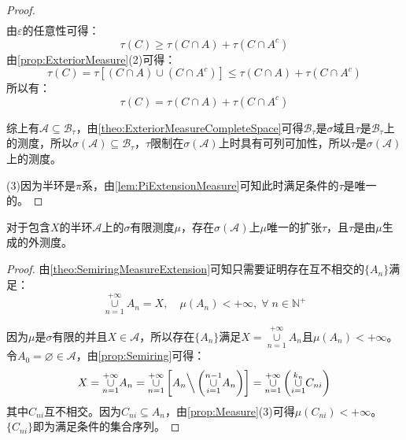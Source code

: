 \begin{proof}
\begin{align*}
	\end{align*}
	由$\varepsilon$的任意性可得：
	\begin{equation*}
		\tau(C)\geqslant\tau(C\cap A)+\tau(C\cap A^c)
	\end{equation*}
	由\cref{prop:ExteriorMeasure}(2)可得：
	\begin{equation*}
		\tau(C)=\tau[(C\cap A)\cup(C\cap A^c)]\leqslant\tau(C\cap A)+\tau(C\cap A^c)
	\end{equation*}
	所以有：
	\begin{equation*}
		\tau(C)=\tau(C\cap A)+\tau(C\cap A^c)
	\end{equation*}\par
	综上有$\mathscr{A}\subseteq\mathscr{B}_\tau$，由\cref{theo:ExteriorMeasureCompleteSpace}可得$\mathscr{B}_\tau$是$\sigma$域且$\tau$是$\mathscr{B}_\tau$上的测度，所以$\sigma(\mathscr{A})\subseteq\mathscr{B}_\tau$，$\tau$限制在$\sigma(\mathscr{A})$上时具有可列可加性，所以$\tau$是$\sigma(\mathscr{A})$上的测度。\par
	(3)因为半环是$\pi$系，由\cref{lem:PiExtensionMeasure}可知此时满足条件的$\tau$是唯一的。
\end{proof}
\begin{corollary}\label{cor:SemiringMeasureExtension}
	对于包含$X$的半环$\mathscr{A}$上的$\sigma$有限测度$\mu$，存在$\sigma(\mathscr{A})$上$\mu$唯一的扩张$\tau$，且$\tau$是由$\mu$生成的外测度。
\end{corollary}
\begin{proof}
	由\cref{theo:SemiringMeasureExtension}可知只需要证明存在互不相交的$\{A_n\}$满足：
	\begin{equation*}
		\underset{n=1}{\overset{+\infty}{\cup}}A_n=X,\quad\mu(A_n)<+\infty,\;\forall\;n\in\mathbb{N}^+
	\end{equation*}\par
	因为$\mu$是$\sigma$有限的并且$X\in\mathscr{A}$，所以存在$\{A_n\}$满足$X=\underset{n=1}{\overset{+\infty}{\cup}}A_n$且$\mu(A_n)<+\infty$。令$A_0=\varnothing\in\mathscr{A}$，由\cref{prop:Semiring}可得：
	\begin{equation*}
		X=\underset{n=1}{\overset{+\infty}{\cup}}A_n=\underset{n=1}{\overset{+\infty}{\cup}}\left[A_n\Big\backslash\left(\underset{i=1}{\overset{n-1}{\cup}}A_n\right)\right]=\underset{n=1}{\overset{+\infty}{\cup}}\left(\underset{i=1}{\overset{k_n}{\cup}}C_{ni}\right)
	\end{equation*}
	其中$C_{ni}$互不相交。因为$C_{ni}\subseteq A_n$，由\cref{prop:Measure}(3)可得$\mu(C_{ni})<+\infty$。$\{C_{ni}\}$即为满足条件的集合序列。
\end{proof}
